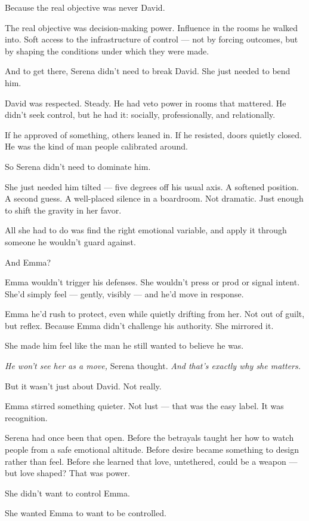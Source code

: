 Because the real objective was never David.

The real objective was decision-making power.
Influence in the rooms he walked into.
Soft access to the infrastructure of control — not by forcing outcomes,
but by shaping the conditions under which they were made.

And to get there, Serena didn’t need to break David.
She just needed to bend him.

David was respected. Steady. He had veto power in rooms that mattered.
He didn’t seek control, but he had it: socially, professionally, and relationally.

If he approved of something, others leaned in.
If he resisted, doors quietly closed.
He was the kind of man people calibrated around.

So Serena didn’t need to dominate him.

She just needed him tilted — five degrees off his usual axis.
A softened position. A second guess. A well-placed silence in a boardroom.
Not dramatic. Just enough to shift the gravity in her favor.

All she had to do was find the right emotional variable,
and apply it through someone he wouldn’t guard against.

And Emma?

Emma wouldn’t trigger his defenses.
She wouldn’t press or prod or signal intent.
She’d simply feel — gently, visibly — and he’d move in response.

Emma he’d rush to protect, even while quietly drifting from her.
Not out of guilt, but reflex.
Because Emma didn’t challenge his authority.
She mirrored it.

She made him feel like the man he still wanted to believe he was.

\textit{He won’t see her as a move,} Serena thought.
\textit{And that’s exactly why she matters.}

But it wasn’t just about David.
Not really.

Emma stirred something quieter.
Not lust — that was the easy label.
It was recognition.

Serena had once been that open.
Before the betrayals taught her how to watch people from a safe emotional altitude.
Before desire became something to design rather than feel.
Before she learned that love, untethered, could be a weapon — but love shaped? That was power.

She didn’t want to control Emma.

She wanted Emma to want to be controlled.

